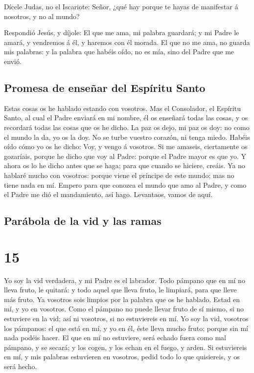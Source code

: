  Dícele Judas, no el Iscariote: Señor, ¿qué hay porque te
hayas de manifestar á nosotros, y no al mundo?

 Respondió Jesús, y díjole: El que me ama, mi palabra
guardará; y mi Padre le amará, y vendremos á él, y haremos con él
morada.  El que no me ama, no guarda mis palabras: y la
palabra que habéis oído, no es mía, sino del Padre que me envió.

\hypertarget{promesa-de-enseuxf1ar-del-espuxedritu-santo}{%
\subsection{Promesa de enseñar del Espíritu
Santo}\label{promesa-de-enseuxf1ar-del-espuxedritu-santo}}

 Estas cosas os he hablado estando con vosotros.
 Mas el Consolador, el Espíritu Santo, al cual el Padre
enviará en mi nombre, él os enseñará todas las cosas, y os recordará
todas las cosas que os he dicho.  La paz os dejo, mi paz
os doy: no como el mundo la da, yo os la doy. No se turbe vuestro
corazón, ni tenga miedo.  Habéis oído cómo yo os he
dicho: Voy, y vengo á vosotros. Si me amaseis, ciertamente os gozaríais,
porque he dicho que voy al Padre: porque el Padre mayor es que yo.
 Y ahora os lo he dicho antes que se haga; para que
cuando se hiciere, creáis.  Ya no hablaré mucho con
vosotros: porque viene el príncipe de este mundo; mas no tiene nada en
mí.  Empero para que conozca el mundo que amo al Padre, y
como el Padre me dió el mandamiento, así hago. Levantaos, vamos de aquí.

\hypertarget{paruxe1bola-de-la-vid-y-las-ramas}{%
\subsection{Parábola de la vid y las
ramas}\label{paruxe1bola-de-la-vid-y-las-ramas}}

\hypertarget{section-43-15}{%
\section{15}\label{section-43-15}}

 Yo soy la vid verdadera, y mi Padre es el labrador.
 Todo pámpano que en mí no lleva fruto, le quitará: y todo
aquel que lleva fruto, le limpiará, para que lleve más fruto.
 Ya vosotros sois limpios por la palabra que os he
hablado.  Estad en mí, y yo en vosotros. Como el pámpano
no puede llevar fruto de sí mismo, si no estuviere en la vid; así ni
vosotros, si no estuviereis en mí.  Yo soy la vid,
vosotros los pámpanos: el que está en mí, y yo en él, éste lleva mucho
fruto; porque sin mí nada podéis hacer.  El que en mí no
estuviere, será echado fuera como mal pámpano, y se secará; y los cogen,
y los echan en el fuego, y arden.  Si estuviereis en mí, y
mis palabras estuvieren en vosotros, pedid todo lo que quisiereis, y os
será hecho.

